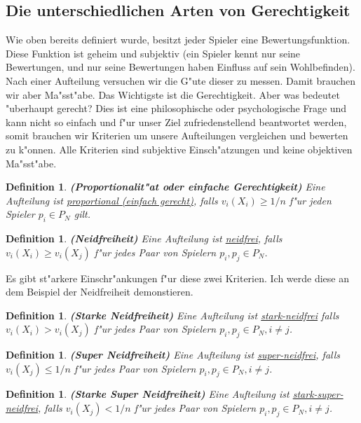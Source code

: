 \documentclass[11pt, a4paper, twoside]{article}
\newtheorem{defi}[satz]{Definition}
\numberwithin{equation}{section}
\begin{document}
\subsection{Die unterschiedlichen Arten von Gerechtigkeit}
Wie oben bereits definiert wurde, besitzt jeder Spieler eine Bewertungsfunktion. Diese Funktion ist geheim und subjektiv (ein Spieler kennt nur seine Bewertungen, und nur seine Bewertungen haben Einfluss auf sein Wohlbefinden). Nach einer Aufteilung versuchen wir die G"ute dieser zu messen. Damit brauchen wir aber Ma"sst"abe. Das Wichtigste ist die Gerechtigkeit. Aber was bedeutet "uberhaupt gerecht? Dies ist eine philosophische oder psychologische Frage und kann nicht so einfach und f"ur unser Ziel zufriedenstellend beantwortet werden, somit brauchen wir Kriterien um unsere Aufteilungen vergleichen und bewerten zu k"onnen. Alle Kriterien sind subjektive Einsch"atzungen und keine objektiven Ma"sst"abe. 
\begin{defi}{\textbf{(Proportionalit"at oder einfache Gerechtigkeit)}}
\newline Eine Aufteilung ist \underline{proportional (einfach gerecht)}, falls  $v_i(X_i) \geq 1/n$ f"ur jeden Spieler $p_i \in P_N$ gilt. 
\end{defi} 
\begin{defi}{\textbf{(Neidfreiheit)}}
\newline Eine Aufteilung ist \underline{neidfrei}, falls $v_i(X_i) \geq v_i(X_j)$ f"ur jedes Paar von Spielern $p_i, p_j \in P_N$. 
\end{defi}
Es gibt st"arkere Einschr"ankungen f"ur diese zwei Kriterien. Ich werde diese an dem Beispiel der Neidfreiheit demonstieren.
\begin{defi}{\textbf{(Starke Neidfreiheit)}}
\newline  Eine Aufteilung ist \underline{stark-neidfrei} falls $v_i(X_i) > v_i(X_j)$ f"ur jedes Paar von Spielern $p_i, p_j \in P_N, i \neq j$.  
\end{defi} 
\begin{defi}{\textbf{(Super Neidfreiheit)}}
\newline Eine Aufteilung ist \underline{super-neidfrei}, falls $v_i(X_j) \leq 1/n$  f"ur jedes Paar von Spielern $p_i, p_j \in P_N, i \neq j$. 
\end{defi} 
\begin{defi}{\textbf{(Starke Super Neidfreiheit)}}
\newline Eine Aufteilung ist \underline{stark-super-neidfrei}, falls $v_i(X_j) < 1/n$  f"ur jedes Paar von Spielern $p_i, p_j \in P_N, i \neq j$. 
\end{defi} 
\end{document}
